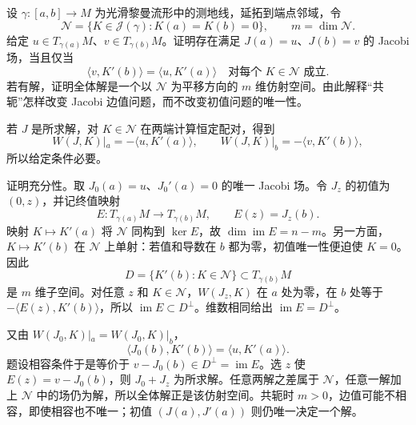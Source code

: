 \begin{exercise}\label{g3:ex:jacobi-conjugate-boundary-compatibility}
	设 \(\gamma:[a,b]\to M\) 为光滑黎曼流形中的测地线，延拓到端点邻域，令
	\[
		\mathcal N=\{K\in\mathcal J(\gamma):K(a)=K(b)=0\},
		\qquad m=\dim\mathcal N.
	\]
	给定 \(u\in T_{\gamma(a)}M\)、\(v\in T_{\gamma(b)}M\)。证明存在满足 \(J(a)=u\)、\(J(b)=v\) 的 Jacobi 场，当且仅当
	\[
		\langle v,K'(b)\rangle=\langle u,K'(a)\rangle
		\quad\text{对每个 }K\in\mathcal N\text{ 成立}.
	\]
	若有解，证明全体解是一个以 \(\mathcal N\) 为平移方向的 \(m\) 维仿射空间。由此解释“共轭”怎样改变 Jacobi 边值问题，而不改变初值问题的唯一性。
\end{exercise}
\begin{solution}
	若 \(J\) 是所求解，对 \(K\in\mathcal N\) 在两端计算恒定配对，得到
	\[
		W(J,K)|_a=-\langle u,K'(a)\rangle,
		\qquad W(J,K)|_b=-\langle v,K'(b)\rangle,
	\]
	所以给定条件必要。

	证明充分性。取 \(J_0(a)=u\)、\(J_0'(a)=0\) 的唯一 Jacobi 场。令 \(J_z\) 的初值为 \((0,z)\)，并记终值映射
	\[
		E:T_{\gamma(a)}M\to T_{\gamma(b)}M,\qquad E(z)=J_z(b).
	\]
	映射 \(K\mapsto K'(a)\) 将 \(\mathcal N\) 同构到 \(\ker E\)，故 \(\dim\operatorname{im}E=n-m\)。另一方面，\(K\mapsto K'(b)\) 在 \(\mathcal N\) 上单射：若值和导数在 \(b\) 都为零，初值唯一性便迫使 \(K=0\)。因此
	\[
		D=\{K'(b):K\in\mathcal N\}\subset T_{\gamma(b)}M
	\]
	是 \(m\) 维子空间。对任意 \(z\) 和 \(K\in\mathcal N\)，\(W(J_z,K)\) 在 \(a\) 处为零，在 \(b\) 处等于 \(-\langle E(z),K'(b)\rangle\)，所以 \(\operatorname{im}E\subset D^\perp\)。维数相同给出 \(\operatorname{im}E=D^\perp\)。

	又由 \(W(J_0,K)|_a=W(J_0,K)|_b\)，
	\[
		\langle J_0(b),K'(b)\rangle=\langle u,K'(a)\rangle.
	\]
	题设相容条件于是等价于 \(v-J_0(b)\in D^\perp=\operatorname{im}E\)。选 \(z\) 使 \(E(z)=v-J_0(b)\)，则 \(J_0+J_z\) 为所求解。任意两解之差属于 \(\mathcal N\)，任意一解加上 \(\mathcal N\) 中的场仍为解，所以全体解正是该仿射空间。共轭时 \(m>0\)，边值可能不相容，即使相容也不唯一；初值 \((J(a),J'(a))\) 则仍唯一决定一个解。
\end{solution}

